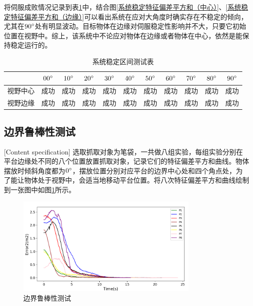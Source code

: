 \documentclass[fontset=fandol,type=bachelor,campus=harbin,bsmainpagenumberline=true]{hithesisbook}
\begin{document}
将伺服成败情况记录到表\ref{系统稳定区间测试表}中，结合图\ref{系统稳定特征偏差平方和（中心）}、\ref{系统稳定特征偏差平方和（边缘）}可以看出系统在应对大角度时确实存在不稳定的倾向，尤其在$90\degree$处有明显波动。目标物体在边缘对伺服稳定性影响并不大，只要它初始位置在视野中。综上，该系统中不论应对物体在边缘或者物体在中心，依然是能保持稳定运行的。
\begin{table}[htbp]
\caption{系统稳定区间测试表}
\label{系统稳定区间测试表}
\vspace{0.5em}\centering\wuhao
\begin{tabular}{ccccccccccc}
\toprule[1.5pt]
   & $00\degree$ & $10\degree$ & $20\degree$ & $30\degree$ & $40\degree$ & $50\degree$ & $60\degree$ & $70\degree$ & $80\degree$ & $90\degree$  \\
\midrule[1pt]
 视野中心 & 成功 & 成功 & 成功 & 成功 & 成功 & 成功 & 成功 & 成功 & 成功 & 成功\\
 视野边缘 & 成功 & 成功 & 成功 & 成功 & 成功 & 成功 & 成功 & 成功 & 成功 & 成功 \\

\bottomrule[1.5pt]
\end{tabular}
\end{table}


\subsection{边界鲁棒性测试}[Content specification]
选取抓取对象为笔袋，一共做八组实验，每组实验分别在平台边缘处不同的八个位置放置抓取对象，记录它们的特征偏差平方和曲线。物体摆放时倾斜角度都为$0\degree$，摆放位置分别对应平台的边界中心处和四个角点处，为了能让物体处于视野中，会适当地移动平台位置。将八次特征偏差平方和曲线绘制到一张图中如图\ref{边界环境特征偏差平方和}所示。
\begin{figure}[h]
	\centering
	\includegraphics[width=0.8\textwidth]{chapter6/边界鲁棒性测试}
	\caption{边界鲁棒性测试}
	\label{边界环境特征偏差平方和}
\end{figure}
\end{document}
